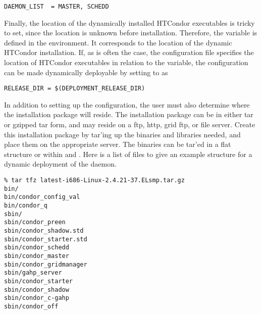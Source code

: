 \footnotesize
\begin{verbatim}
DAEMON_LIST  = MASTER, SCHEDD
\end{verbatim}
\normalsize

Finally, the location
of the dynamically installed HTCondor executables is tricky to set,
since the location is unknown before installation.
Therefore,
the variable  is defined in the environment.
It corresponds to the location of the dynamic HTCondor installation.
If, as is often the case, 
the configuration file specifies the location of HTCondor executables in
relation to the  variable, the configuration can
be made dynamically deployable by setting  to
 as 

\footnotesize
\begin{verbatim}
RELEASE_DIR = $(DEPLOYMENT_RELEASE_DIR)
\end{verbatim}
\normalsize

In addition to setting up the configuration, the user must also
determine where the installation package will reside.
The installation package can be in either tar or 
gzipped tar form, and may
reside on a ftp, http, grid ftp, or file server.  
Create this installation package by tar'ing up the binaries and libraries
needed, and place them on the appropriate server.
The binaries can be tar'ed in a flat structure or within  and
.  Here is a list of files to give an example
structure for a dynamic deployment of the  daemon.

\footnotesize
\begin{verbatim}
% tar tfz latest-i686-Linux-2.4.21-37.ELsmp.tar.gz
bin/
bin/condor_config_val
bin/condor_q
sbin/
sbin/condor_preen
sbin/condor_shadow.std
sbin/condor_starter.std
sbin/condor_schedd
sbin/condor_master
sbin/condor_gridmanager
sbin/gahp_server
sbin/condor_starter
sbin/condor_shadow
sbin/condor_c-gahp
sbin/condor_off 
\end{verbatim}
\normalsize
